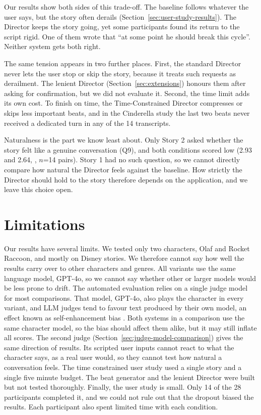 Our results show both sides of this trade-off. The baseline follows whatever the user says, but the story often derails (Section~\ref{sec:user-study-results}). The Director keeps the story going, yet some participants found its return to the script rigid. One of them wrote that ``at some point he should break this cycle''. Neither system gets both right.

The same tension appears in two further places. First, the standard Director never lets the user stop or skip the story, because it treats such requests as derailment. The lenient Director (Section~\ref{sec:extensions}) honours them after asking for confirmation, but we did not evaluate it. Second, the time limit adds its own cost. To finish on time, the Time-Constrained Director compresses or skips less important beats, and in the Cinderella study the last two beats never received a dedicated turn in any of the 14 transcripts.

Naturalness is the part we know least about. Only Story 2 asked whether the story felt like a genuine conversation (Q9), and both conditions scored low (2.93 and 2.64, , $n$=14 pairs). Story 1 had no such question, so we cannot directly compare how natural the Director feels against the baseline. How strictly the Director should hold to the story therefore depends on the application, and we leave this choice open.

\section{Limitations}\label{sec:limitations}

Our results have several limits. We tested only two characters, Olaf and Rocket Raccoon, and mostly on Disney stories. We therefore cannot say how well the results carry over to other characters and genres. All variants use the same language model, GPT-4o, so we cannot say whether other or larger models would be less prone to drift. The automated evaluation relies on a single judge model for most comparisons. That model, GPT-4o, also plays the character in every variant, and LLM judges tend to favour text produced by their own model, an effect known as self-enhancement bias \cite{zheng2023judging}. Both systems in a comparison use the same character model, so the bias should affect them alike, but it may still inflate all scores. The second judge (Section~\ref{sec:judge-model-comparison}) gives the same direction of results. Its scripted user inputs cannot react to what the character says, as a real user would, so they cannot test how natural a conversation feels. The time constrained user study used a single story and a single five minute budget. The beat generator and the lenient Director were built but not tested thoroughly. Finally, the user study is small. Only 14 of the 28 participants completed it, and we could not rule out that the dropout biased the results. Each participant also spent limited time with each condition.

